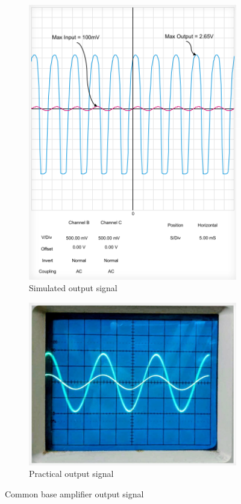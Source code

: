 \documentclass[12pt]{article}
\begin{document}
\begin{figure}[h!]
    \centering
    \begin{subfigure}{0.45\textwidth}
        \includegraphics[width=\linewidth]{CB_sim.png}
        \caption{Simulated output signal}
        \label{fig:CB sim}
    \end{subfigure}
    \begin{subfigure}{0.45\textwidth}
        \includegraphics[width=\linewidth]{CB_prac.png}
        \caption{Practical output signal}
        \label{fig:CB prac}
    \end{subfigure}
    \caption{Common base amplifier output signal}
    \label{fig:CB signals}
\end{figure}
\end{document}
